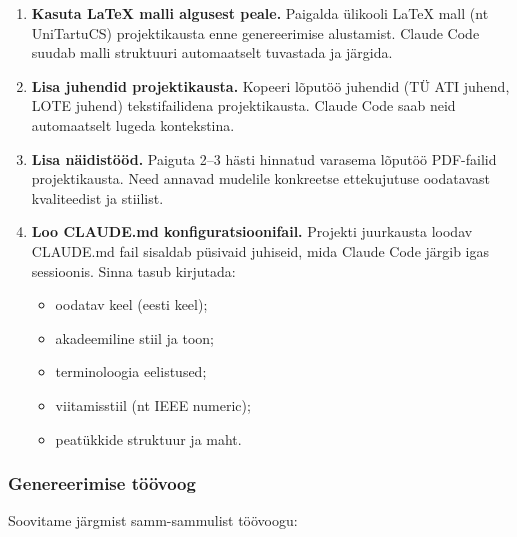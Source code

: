\begin{enumerate}
    \item \textbf{Kasuta \LaTeX{} malli algusest peale.} Paigalda ülikooli \LaTeX{} mall (nt UniTartuCS) projektikausta enne genereerimise alustamist. Claude Code suudab malli struktuuri automaatselt tuvastada ja järgida.
    \item \textbf{Lisa juhendid projektikausta.} Kopeeri lõputöö juhendid (TÜ ATI juhend, LOTE juhend) tekstifailidena projektikausta. Claude Code saab neid automaatselt lugeda kontekstina.
    \item \textbf{Lisa näidistööd.} Paiguta 2--3 hästi hinnatud varasema lõputöö PDF-failid projektikausta. Need annavad mudelile konkreetse ettekujutuse oodatavast kvaliteedist ja stiilist.
    \item \textbf{Loo CLAUDE.md konfiguratsioonifail.} Projekti juurkausta loodav CLAUDE.md fail sisaldab püsivaid juhiseid, mida Claude Code järgib igas sessioonis. Sinna tasub kirjutada:
    \begin{itemize}
        \item oodatav keel (eesti keel);
        \item akadeemiline stiil ja toon;
        \item terminoloogia eelistused;
        \item viitamisstiil (nt IEEE numeric);
        \item peatükkide struktuur ja maht.
    \end{itemize}
\end{enumerate}

\subsubsection{Genereerimise töövoog}

Soovitame järgmist samm-sammulist töövoogu:

